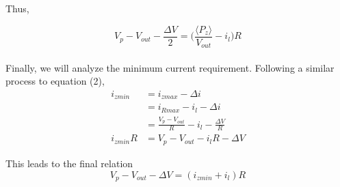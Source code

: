 \documentclass[12pt]{article}
\begin{document}
Thus,

\begin{equation}
\boxed{V_p - V_{out} - \frac{\Delta V}{2} = \Big(\frac{\langle P_z \rangle}{V_{out}} - i_l\Big)R}
\end{equation}
\\

Finally, we will analyze the minimum current requirement. Following a similar process to equation (2),
\[
\begin{aligned}
i_{zmin}  & = i_{zmax} - \Delta i\\
          & = i_{Rmax} - i_l -\Delta i\\
          & = \frac{V_p - V_{out}}{R} - i_l - \frac{\Delta V}{R}\\
i_{zmin}R & = V_p - V_{out} - i_lR - \Delta V
\end{aligned}
\]

This leads to the final relation
\begin{equation}
\boxed{V_p - V_{out} - \Delta V = (i_{zmin} + i_l)R}
\end{equation}
\end{document}
